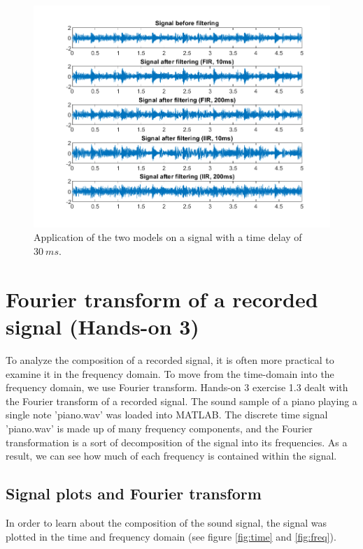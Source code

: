 \documentclass[journal]{IEEEtran}
\begin{document}
\begin{figure}
    \centering
    \includegraphics[width=\linewidth]{assignment_01/plots/bounce_signals.png}
    \caption{Application of the two models on a signal with a time delay of $\SI{30}{ms}$.}
    \label{fig:bounce:signals}
\end{figure}


\section{Fourier transform of a recorded signal (Hands-on 3)}
To analyze the composition of a recorded signal, it is often more practical to examine it in the frequency domain. To move from the time-domain into the frequency domain, we use Fourier transform. 
Hands-on 3 exercise 1.3 dealt with the Fourier transform of a recorded signal. The sound sample of a piano playing a single note 'piano.wav' was loaded into MATLAB. The discrete time signal 'piano.wav' is made up of many frequency components, and the Fourier transformation is a sort of decomposition of the signal into its frequencies. As a result, we can see how much of each frequency is contained within the signal.


\subsection{Signal plots and Fourier transform}
In order to learn about the composition of the sound signal, the signal was plotted in the time and frequency domain (see figure \ref{fig:time} and \ref{fig:freq}). 
\end{document}
